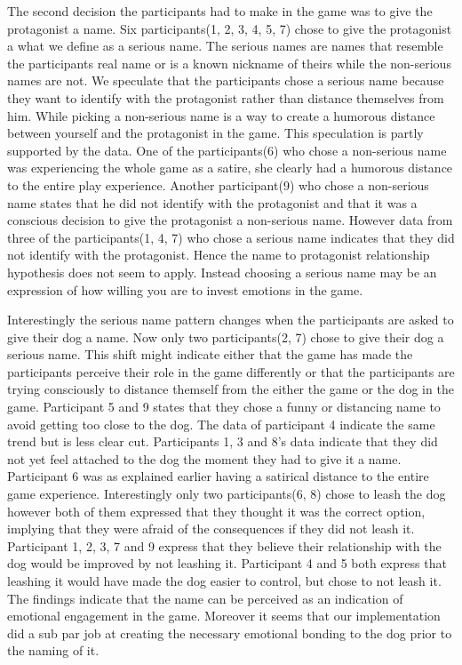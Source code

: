The second decision the participants had to make in the game was to give the protagonist a name. Six participants(1, 2, 3, 4, 5, 7) chose to give the protagonist a what we define as a serious name. The serious names are names that resemble the participants real name or is a known nickname of theirs while the non-serious names are not. We speculate that the participants chose a serious name because they want to identify with the protagonist rather than distance themselves from him. While picking a non-serious name is a way to create a humorous distance between yourself and the protagonist in the game. This speculation is partly supported by the data. One of the participants(6) who chose a non-serious name was experiencing the whole game as a satire, she clearly had a humorous distance to the entire play experience. Another participant(9) who chose a non-serious name states that he did not identify with the protagonist and that it was a conscious decision to give the protagonist a non-serious name. However data from three of the participants(1, 4, 7) who chose a serious name indicates that they did not identify with the protagonist. Hence the name to protagonist relationship hypothesis does not seem to apply. Instead choosing a serious name may be an expression of how willing you are to invest emotions in the game.

Interestingly the serious name pattern changes when the participants are asked to give their dog a name. Now only two participants(2, 7) chose to give their dog a serious name. This shift might indicate either that the game has made the participants perceive their role in the game differently or that the participants are trying consciously to distance themself from the either the game or the dog in the game. Participant 5 and 9 states that they chose a funny or distancing name to avoid getting too close to the dog. The data of participant 4 indicate the same trend but is less clear cut. Participants 1, 3 and 8's data indicate that they did not yet feel attached to the dog the moment they had to give it a name. Participant 6 was as explained earlier having a satirical distance to the entire game experience.
Interestingly only two participants(6, 8) chose to leash the dog however both of them expressed that they thought it was the correct option, implying that they were afraid of the consequences if they did not leash it. Participant 1, 2, 3, 7 and 9 express that they believe their relationship with the dog would be improved by not leashing it. Participant 4 and 5 both express that leashing it would have made the dog easier to control, but chose to not leash it. The findings indicate that the name can be perceived as an indication of emotional engagement in the game. Moreover it seems that our implementation did a sub par job at creating the necessary emotional bonding to the dog prior to the naming of it.


